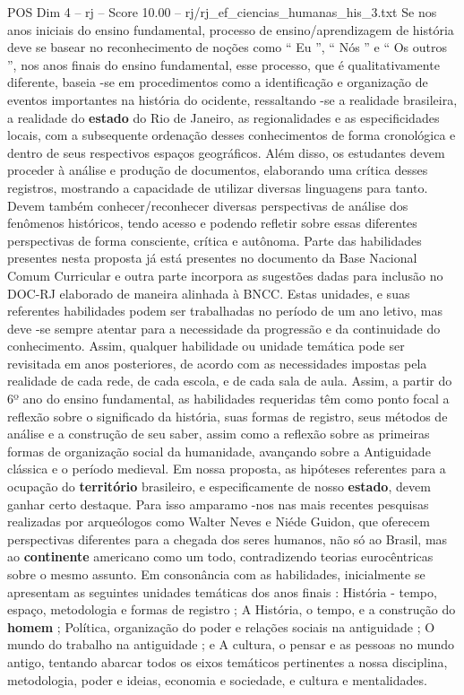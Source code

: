 \begin{textsample}{POS Dim 4 – rj – Score 10.00 – rj/rj\_ef\_ciencias\_humanas\_his\_3.txt}
Se nos anos iniciais do ensino fundamental, processo de ensino/aprendizagem de história deve se basear no reconhecimento de noções como “ Eu ”, “ Nós ” e “ Os outros ”, nos anos finais do ensino fundamental, esse processo, que é qualitativamente diferente, baseia -se em procedimentos como a identificação e organização de eventos importantes na história do ocidente, ressaltando -se a realidade brasileira, a realidade do \textbf{estado} do Rio de Janeiro, as regionalidades e as especificidades locais, com a subsequente ordenação desses conhecimentos de forma cronológica e dentro de seus respectivos espaços geográficos.
Além disso, os estudantes devem proceder à análise e produção de documentos, elaborando uma crítica desses registros, mostrando a capacidade de utilizar diversas linguagens para tanto.
Devem também conhecer/reconhecer diversas perspectivas de análise dos fenômenos históricos, tendo acesso e podendo refletir sobre essas diferentes perspectivas de forma consciente, crítica e autônoma.
Parte das habilidades presentes nesta proposta já está presentes no documento da Base Nacional Comum Curricular e outra parte incorpora as sugestões dadas para inclusão no DOC-RJ elaborado de maneira alinhada à BNCC.
Estas unidades, e suas referentes habilidades podem ser trabalhadas no período de um ano letivo, mas deve -se sempre atentar para a necessidade da progressão e da continuidade do conhecimento.
Assim, qualquer habilidade ou unidade temática pode ser revisitada em anos posteriores, de acordo com as necessidades impostas pela realidade de cada rede, de cada escola, e de cada sala de aula.
Assim, a partir do 6º ano do ensino fundamental, as habilidades requeridas têm como ponto focal a reflexão sobre o significado da história, suas formas de registro, seus métodos de análise e a construção de seu saber, assim como a reflexão sobre as primeiras formas de organização social da humanidade, avançando sobre a Antiguidade clássica e o período medieval.
Em nossa proposta, as hipóteses referentes para a ocupação do \textbf{território} brasileiro, e especificamente de nosso \textbf{estado}, devem ganhar certo destaque.
Para isso amparamo -nos nas mais recentes pesquisas realizadas por arqueólogos como Walter Neves e Niéde Guidon, que oferecem perspectivas diferentes para a chegada dos seres humanos, não só ao Brasil, mas ao \textbf{continente} americano como um todo, contradizendo teorias eurocêntricas sobre o mesmo assunto.
Em consonância com as habilidades, inicialmente se apresentam as seguintes unidades temáticas dos anos finais : História - tempo, espaço, metodologia e formas de registro ; A História, o tempo, e a construção do \textbf{homem} ; Política, organização do poder e relações sociais na antiguidade ; O mundo do trabalho na antiguidade ; e A cultura, o pensar e as pessoas no mundo antigo, tentando abarcar todos os eixos temáticos pertinentes a nossa disciplina, metodologia, poder e ideias, economia e sociedade, e cultura e mentalidades.

\end{textsample}

